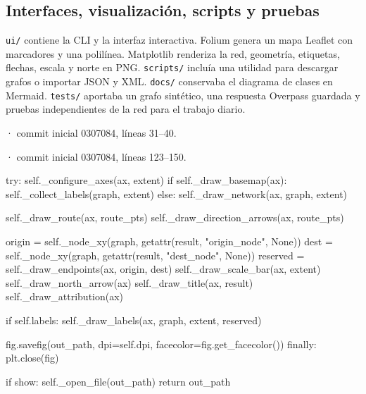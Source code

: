 \documentclass[11pt,a4paper]{article}
\begin{document}
\subsection{Interfaces, visualización, scripts y pruebas}
\texttt{ui/} contiene la CLI y la interfaz interactiva. Folium genera un mapa Leaflet con marcadores y una polilínea. Matplotlib renderiza la red, geometría, etiquetas, flechas, escala y norte en PNG. \texttt{scripts/} incluía una utilidad para descargar grafos o importar JSON y XML. \texttt{docs/} conservaba el diagrama de clases en Mermaid. \texttt{tests/} aportaba un grafo sintético, una respuesta Overpass guardada y pruebas independientes de la red para el trabajo diario.

\smallskip
{\footnotesize\texttt{} · commit inicial 0307084, líneas 31--40.}\par
{}

\smallskip
{\footnotesize\texttt{} · commit inicial 0307084, líneas 123--150.}\par
\begin{Codigo}[firstnumber=123]
        try:
            self._configure_axes(ax, extent)
            if self._draw_basemap(ax):
                self._collect_labels(graph, extent)
            else:
                self._draw_network(ax, graph, extent)

            self._draw_route(ax, route_pts)
            self._draw_direction_arrows(ax, route_pts)

            origin = self._node_xy(graph, getattr(result, "origin_node", None))
            dest = self._node_xy(graph, getattr(result, "dest_node", None))
            reserved = self._draw_endpoints(ax, origin, dest)
            self._draw_scale_bar(ax, extent)
            self._draw_north_arrow(ax)
            self._draw_title(ax, result)
            self._draw_attribution(ax)

            if self.labels:
                self._draw_labels(ax, graph, extent, reserved)

            fig.savefig(out_path, dpi=self.dpi, facecolor=fig.get_facecolor())
        finally:
            plt.close(fig)

        if show:
            self._open_file(out_path)
        return out_path
\end{Codigo}
\end{document}
